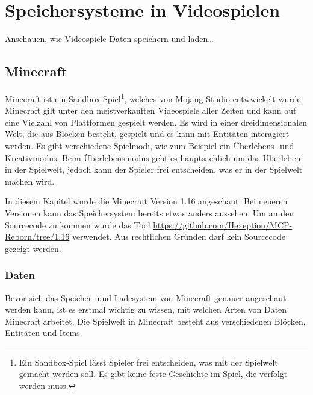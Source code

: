 \chapter{Speichersysteme in Videospielen}\label{ch:videospiele}
Anschauen, wie Videospiele Daten speichern und laden\dots


\section{Minecraft}
Minecraft ist ein Sandbox-Spiel\footnote{Ein Sandbox-Spiel lässt Spieler frei entscheiden, was mit der Spielwelt gemacht werden soll. Es gibt keine feste Geschichte im Spiel, die verfolgt werden muss.\cite{ocio2009multi}}, welches von Mojang Studio entwwickelt wurde. Minecraft gilt unter den meistverkauften Videospiele aller Zeiten und kann auf eine Vielzahl von Plattformen gespielt werden.\cite{ignBestSellingVideo} Es wird in einer dreidimensionalen Welt, die aus Blöcken besteht, gespielt und es kann mit Entitäten interagiert werden. Es gibt verschiedene Spielmodi, wie zum Beispiel ein Überlebens- und Kreativmodus. Beim Überlebensmodus geht es hauptsächlich um das Überleben in der Spielwelt, jedoch kann der Spieler frei entscheiden, was er in der Spielwelt machen wird.\cite{minecraftWikiHome}


In diesem Kapitel wurde die Minecraft Version 1.16 angeschaut. 
Bei neueren Versionen kann das Speichersystem bereits etwas anders aussehen. Um an den Sourcecode zu kommen wurde das Tool 
\url{https://github.com/Hexeption/MCP-Reborn/tree/1.16} verwendet. Aus rechtlichen Gründen darf kein
Sourcecode gezeigt werden.

\subsection{Daten}
Bevor sich das Speicher- und Ladesystem von Minecraft genauer angeschaut werden kann, ist es erstmal wichtig zu wissen, mit welchen Arten von Daten Minecraft arbeitet. Die Spielwelt in Minecraft besteht aus verschiedenen Blöcken, Entitäten und Items. 

